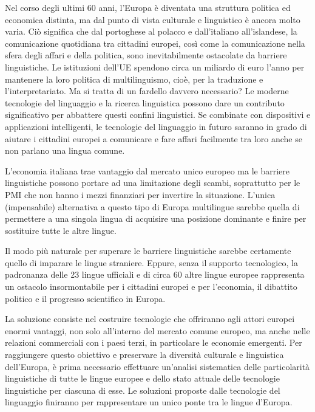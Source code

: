 \documentclass[]{../../metanetpaper}
\begin{document}
\begin{multicols}{2}
Nel corso degli ultimi 60 anni, l'Europa \`{e} diventata una struttura
politica ed economica distinta, ma dal punto di vista culturale e linguistico
\`{e} ancora molto varia. Ci\`{o} significa che dal portoghese al polacco e
dall'italiano all'islandese, la comunicazione quotidiana tra cittadini
europei, cos\`{i} come la comunicazione nella sfera degli affari e della
politica, sono inevitabilmente ostacolate da barriere linguistiche. Le
istituzioni dell'UE spendono circa un miliardo di euro l'anno per mantenere la
loro politica di multilinguismo, cio\`{e}, per la traduzione e
l'interpretariato. Ma si tratta di un fardello davvero necessario? Le moderne
tecnologie del linguaggio e la ricerca linguistica possono dare un contributo
significativo per abbattere questi confini linguistici. Se combinate con
dispositivi e applicazioni intelligenti, le tecnologie del linguaggio in
futuro saranno in grado di aiutare i cittadini europei a comunicare e fare
affari facilmente tra loro anche se non parlano una lingua comune.




L'economia italiana trae vantaggio dal mercato unico
europeo ma le barriere linguistiche
possono portare ad una limitazione degli scambi, soprattutto per le PMI che non hanno
i mezzi finanziari per invertire la situazione. L'unica (impensabile)
alternativa a questo tipo di Europa multilingue sarebbe quella di permettere a
una singola lingua di acquisire una posizione dominante e finire per
sostituire tutte le altre lingue.

Il modo pi\`{u} naturale per superare le barriere linguistiche sarebbe
certamente quello di imparare le lingue straniere. Eppure, senza il supporto
tecnologico, la padronanza delle 23 lingue ufficiali e di circa 60 altre
lingue europee rappresenta un ostacolo insormontabile per i cittadini europei
e per l'economia, il dibattito politico e il progresso scientifico in Europa.

La soluzione consiste nel costruire tecnologie che offriranno agli attori
europei enormi vantaggi, non solo all'interno del mercato comune europeo, ma
anche nelle relazioni commerciali con i paesi terzi, in particolare le
economie emergenti. Per raggiungere questo obiettivo e preservare la
diversit\`{a} culturale e linguistica dell'Europa, \`{e} prima necessario
effettuare un'analisi sistematica delle particolarit\`{a} linguistiche di
tutte le lingue europee e dello stato attuale delle tecnologie linguistiche
per ciascuna di esse. Le soluzioni proposte dalle tecnologie del linguaggio
finiranno per rappresentare un unico ponte tra le lingue d'Europa.


\end{multicols}
\end{document}
